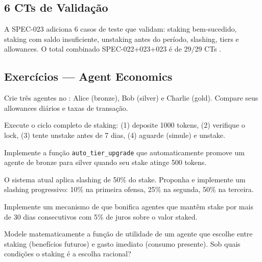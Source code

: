 \subsection{6 CTs de Validação}

A SPEC-023 adiciona 6 casos de teste que validam: staking
bem-sucedido, staking com saldo insuficiente, unstaking antes
do período, slashing, tiers e allowances. O total combinado
SPEC-022+023+023 é de 29/29 CTs \cite{opencode2026token}.

\subsection{Exercícios — Agent Economics}

\begin{exercicio}
Crie três agentes no \opencodeeco{}: Alice (bronze), Bob (silver)
e Charlie (gold). Compare seus allowances diários e taxas de
transação.
\end{exercicio}

\begin{exercicio}
Execute o ciclo completo de staking: (1) deposite 1000 tokens,
(2) verifique o lock, (3) tente unstake antes de 7 dias, (4)
aguarde (simule) e unstake.
\end{exercicio}

\begin{exercicio}
Implemente a função \lstinline{auto_tier_upgrade} que
automaticamente promove um agente de bronze para silver quando
seu stake atinge 500 tokens.
\end{exercicio}

\begin{exercicio}
O sistema atual aplica slashing de 50\% do stake. Proponha e
implemente um slashing progressivo: 10\% na primeira ofensa,
25\% na segunda, 50\% na terceira.
\end{exercicio}

\begin{exercicio}
Implemente um mecanismo de  que bonifica agentes
que mantêm stake por mais de 30 dias consecutivos com 5\% de
juros sobre o valor staked.
\end{exercicio}

\begin{exercicio}
Modele matematicamente a função de utilidade de um agente que
escolhe entre staking (benefícios futuros) e gasto imediato
(consumo presente). Sob quais condições o staking é a escolha
racional?
\end{exercicio}

